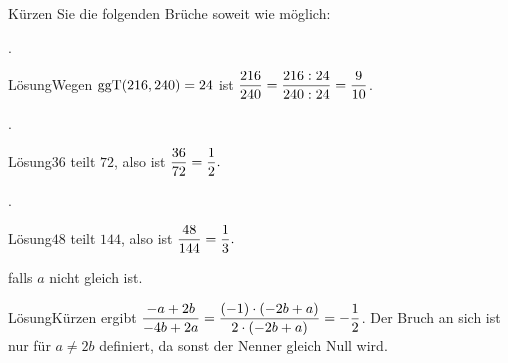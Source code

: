 \begin{MExercises}

\begin{MExercise}
Kürzen Sie die folgenden Brüche soweit wie möglich:
\begin{MExerciseItems}
\item{. \begin{MHint}{Lösung}Wegen $\mathrm{ggT}(216,240)=24$ ist $\displaystyle\dfrac{216}{240}=\dfrac{216:24}{240:24}=\dfrac{9}{10}$.\end{MHint}}
\item{. \begin{MHint}{Lösung}$36$ teilt $72$, also ist $\dfrac{36}{72}=\dfrac{1}{2}.$\end{MHint}} 
\item{. \begin{MHint}{Lösung}$48$ teilt $144$, also ist $\dfrac{48}{144}=\dfrac{1}{3}.$\end{MHint}}
\item{ falls $a$ nicht gleich  ist. \begin{MHint}{Lösung}Kürzen ergibt $\dfrac{-a+2b}{-4b+2a}=\dfrac{(-1)\cdot (-2b+a)}{2\cdot (-2b+a)}=-\dfrac{1}{2}$. Der Bruch an sich ist nur für $a\not=2b$ definiert, da sonst der Nenner gleich Null wird.\end{MHint}} 
\end{MExerciseItems}
\end{MExercise}


\end{MExercises}
